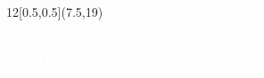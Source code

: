 \begin{frame}
\cleardoublepage
\pagecolor{black}

\begin{textblock}{12}[0.5,0.5](7.5,19)
    \textcolor{white}{
    \part[Plan]{problems of shooting: plan}
    \label{plan}
	}
\end{textblock}

\end{frame}





